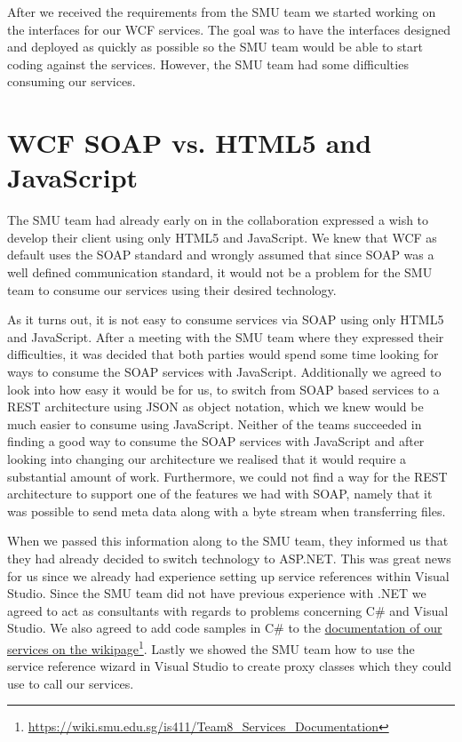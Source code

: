 \documentclass[../report.tex]{subfiles}
\begin{document}
After we received the requirements from the SMU team we started working on the interfaces for our WCF services. 
The goal was to have the interfaces designed and deployed as quickly as possible so the SMU team would be able to start coding against the services.
However, the SMU team had some difficulties consuming our services.
\section{WCF SOAP vs. HTML5 and JavaScript}
The SMU team had already early on in the collaboration expressed a wish to develop their client using only HTML5 and JavaScript. 
We knew that WCF as default uses the SOAP standard and wrongly assumed that since SOAP was a well defined communication standard, it would not be a problem for the SMU team to consume our services using their desired technology.

As it turns out, it is not easy to consume services via SOAP using only HTML5 and JavaScript.
After a meeting with the SMU team where they expressed their difficulties, it was decided that both parties would spend some time looking for ways to consume the SOAP services with JavaScript.
Additionally we agreed to look into how easy it would be for us, to switch from SOAP based services to a REST architecture using JSON as object notation, which we knew would be much easier to consume using JavaScript.
Neither of the teams succeeded in finding a good way to consume the SOAP services with JavaScript and after looking into changing our architecture we realised that it would require a substantial amount of work.
Furthermore, we could not find a way for the REST architecture to support one of the features we had with SOAP, namely that it was possible to send meta data along with a byte stream when transferring files.

When we passed this information along to the SMU team, they informed us that they had already decided to switch technology to ASP.NET.
This was great news for us since we already had experience setting up service references within Visual Studio.
Since the SMU team did not have previous experience with .NET we agreed to act as consultants with regards to problems concerning C\# and Visual Studio.
We also agreed to add code samples in C\# to the \href{https://wiki.smu.edu.sg/is411/Team8\_Services\_Documentation}{documentation of our services on the wikipage}\footnote{\url{https://wiki.smu.edu.sg/is411/Team8\_Services\_Documentation}}.
Lastly we showed the SMU team how to use the service reference wizard in Visual Studio to create proxy classes which they could use to call our services.
\end{document}

